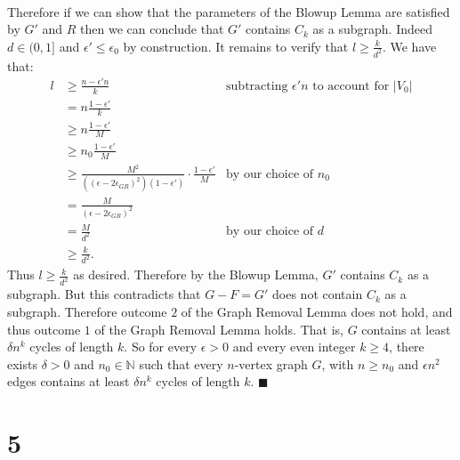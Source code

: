 \documentclass[letterpaper,12pt,oneside,onecolumn]{article}
\newcommand{\N}{\mathbb{N}} \newcommand{\R}{\mathbb{R}}
\begin{document}
\paragraph{}
Therefore if we can show that the parameters of the Blowup Lemma are satisfied by $G'$ and $R$ then we can conclude that $G'$ contains $C_k$ as a subgraph. Indeed $d \in (0,1]$ and $\epsilon' \leq \epsilon_0$ by construction. It remains to verify that $l \geq \frac{k}{d^2}$. We have that:
\begin{align*}
l &\geq \frac{n-\epsilon'n}{k} &\text{subtracting $\epsilon'n$ to account for $|V_0|$}\\
&= n\frac{1-\epsilon'}{k} \\
&\geq n\frac{1-\epsilon'}{M}\\
&\geq n_0 \frac{1-\epsilon'}{M} \\
&\geq \frac{M^2}{((\epsilon-2\epsilon_{GR})^2)(1-\epsilon')} \cdot \frac{1-\epsilon'}{M} &\text{by our choice of $n_0$} \\
&= \frac{M}{(\epsilon-2\epsilon_{GR})^2} \\
&= \frac{M}{d^2} &\text{by our choice of $d$}\\
&\geq \frac{k}{d^2}.
\end{align*}
Thus $l \geq \frac{k}{d^2}$ as desired. Therefore by the Blowup Lemma, $G'$ contains $C_k$ as a subgraph. But this contradicts that $G-F = G'$ does not contain $C_k$ as a subgraph. Therefore outcome $2$ of the Graph Removal Lemma does not hold, and thus outcome $1$ of the Graph Removal Lemma holds. That is, $G$ contains at least $\delta n^k$ cycles of length $k$. So for every $\epsilon > 0$ and every even integer $k \geq 4$, there exists $\delta > 0$ and $n_0 \in \N$ such that every $n$-vertex graph $G$, with $n\geq n_0$ and $\epsilon n^2$ edges contains at least $\delta n^k$ cycles of length $k$. $\blacksquare$
\section*{5}
\end{document}
